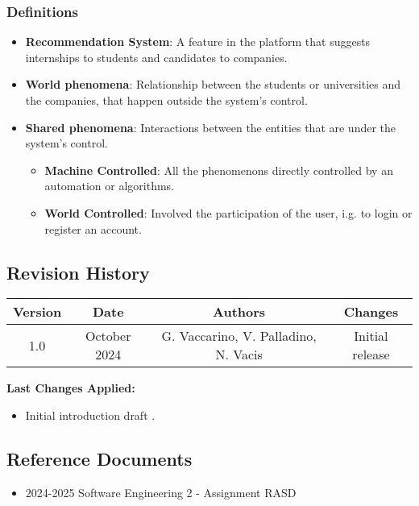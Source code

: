\subsubsection{Definitions}
\begin{itemize}
    \item \textbf{Recommendation System}: A feature in the platform that suggests internships to students and candidates to companies.
    \item \textbf{World phenomena}: Relationship between the students or universities and the companies, that happen outside the system's control.
    \item \textbf{Shared phenomena}: Interactions between the entities that are under the system's control.
    \begin{itemize}
        \item \textbf{Machine Controlled}: All the phenomenons directly controlled by an automation or algorithms.  
        \item \textbf{World Controlled}: Involved the participation of the user, i.g. to login or register an account.
    \end{itemize}
\end{itemize}

\subsection{Revision History}
    
\begin{tabular}{|c|c|c|c|}
    \hline
    Version & Date & Authors & Changes \\
    \hline
    1.0 & October 2024 & G. Vaccarino, V. Palladino, N. Vacis & Initial release \\
    \hline
\end{tabular}

\vspace{7mm}

\textbf{Last Changes Applied:}

\begin{itemize}
        \item Initial introduction draft . 
\end{itemize}

\subsection{Reference Documents}
\begin{itemize}
    \item 2024-2025 Software Engineering 2 - Assignment RASD
\end{itemize}

